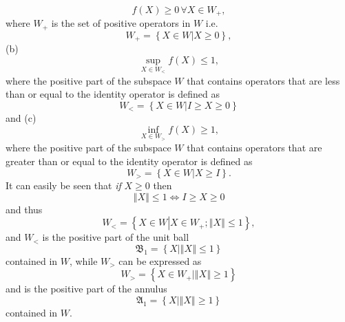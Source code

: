 \documentclass[aps,preprint]{revtex4}%
\begin{document}
\begin{equation}
f\left(  X\right)  \geq0\,\forall X\in W_{+}, \label{Positivity}%
\end{equation}
where $W_{+}$ is the set of positive operators in $W$ i.e.
\begin{equation}
W_{+}=\left\{  X\in W\left\vert X\geq0\right.  \right\}  ,
\end{equation}
(b)%
\begin{equation}
\sup_{X\in W_{<}}f\left(  X\right)  \leq1, \label{Supcond}%
\end{equation}
where the positive part of the subspace $W$ that contains operators that are
less than or equal to the identity operator is defined as
\begin{equation}
W_{<}=\left\{  X\in W\left\vert I\geq X\geq0\right.  \right\}
\end{equation}
and (c)
\begin{equation}
\inf_{X\in W_{>}}f\left(  X\right)  \geq1, \label{Infcond}%
\end{equation}
where the positive part of the subspace $W$ that contains operators that are
greater than or equal to the identity operator is defined as
\begin{equation}
W_{>}=\left\{  X\in W\left\vert X\geq I\right.  \right\}  .
\end{equation}
It can easily be seen that \emph{if} $X\geq0$ then
\begin{equation}
\left\Vert X\right\Vert \leq1\Leftrightarrow I\geq X\geq0
\end{equation}
and thus
\begin{equation}
W_{<}=\left\{  X\in W\left\vert X\in W_{+};\left\Vert X\right\Vert
\leq1\right.  \right\}  ,
\end{equation}
and $W_{<}$ is the positive part of the unit ball
\begin{equation}
\mathfrak{B}_{1}=\left\{  X\left\vert \left\Vert X\right\Vert \leq1\right.
\right\}
\end{equation}
contained in $W$, while $W_{>}$ can be expressed as
\begin{equation}
W_{>}=\left\{  X\in W_{+}\left\vert \left\Vert X\right\Vert \geq1\right.
\right\}
\end{equation}
and is the positive part of the annulus%
\begin{equation}
\mathfrak{A}_{1}=\left\{  X\left\vert \left\Vert X\right\Vert \geq1\right.
\right\}
\end{equation}
contained in $W.$
\end{document}
